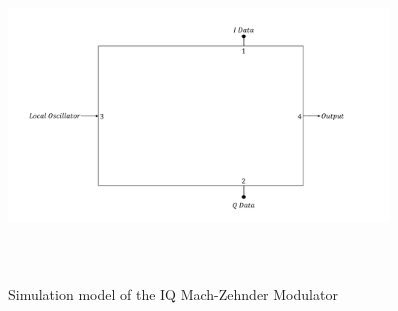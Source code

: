 \begin{refsection}
\begin{figure}[h]
 	\includegraphics[width=0.9\textwidth, height=8cm]{./lib/iq_modulator/figures/Black_Box.pdf}
 	\label{Black_Box}\caption{Simulation model of the IQ Mach-Zehnder Modulator}
 \end{figure}

\clearpage
\printbibliography[heading=subbibliography]
\end{refsection}
\cleardoublepage
